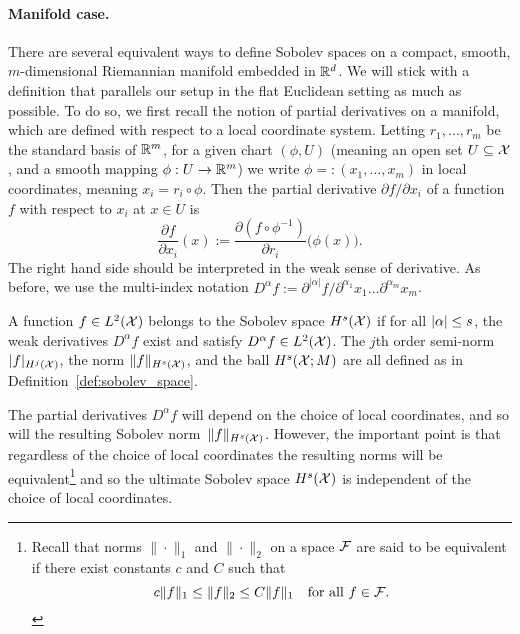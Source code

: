 \paragraph{Manifold case.}

There are several equivalent ways to define Sobolev spaces on a compact, smooth, $m$-dimensional Riemannian manifold embedded in $\mathbb{R}^d$. We will stick with a definition that parallels our setup in the flat Euclidean setting as much as possible. To do so, we first recall the notion of partial derivatives on a manifold, which are defined with respect to a local coordinate system. Letting $r_1,\ldots,r_m$ be the standard basis of $\mathbb{R}^m$, for a given chart $(\phi,U)$ (meaning an open set $U \subseteq \mathcal{X}$, and a smooth mapping $\phi: U \to \mathbb{R}^m$) we write $\phi =: (x_1,\ldots,x_m)$ in local coordinates, meaning $x_i = r_i \circ \phi$. Then the partial derivative $\partial f/\partial x_i$ of a function $f$ with respect to $x_i$ at $x \in U$ is
\begin{equation*}
\frac{\partial f}{\partial x_i}(x) := \frac{\partial(f \circ \phi^{-1})}{\partial r_i}\bigl(\phi(x)\bigr).
\end{equation*}
The right hand side should be interpreted in the weak sense of derivative. As before, we use the multi-index notation $D^{\alpha}f := \partial^{|\alpha|}f/\partial^{\alpha_1}x_1\ldots\partial^{\alpha_m}x_m$. 

\begin{definition}
	\label{def:sobolev_space_manifold}
	A function $f \in L^2(\mathcal{X})$ belongs to the Sobolev space $H^{s}(\mathcal{X})$ if for all $\left \lvert \alpha \right \rvert \leq s$, the weak derivatives $D^{\alpha}f$ exist and satisfy  $D^{\alpha}f \in L^2(\mathcal{X})$. The $j$th order semi-norm $|f|_{H^j(\mathcal{X})}$, the norm $\|f\|_{H^s(\mathcal{X})}$, and the ball $H^s(\mathcal{X};M)$ are all defined as in Definition~\ref{def:sobolev_space}.
\end{definition}
The partial derivatives $D^{\alpha}f$ will depend on the choice of local coordinates, and so will the resulting Sobolev norm~$\|f\|_{H^s(\mathcal{X})}$. However, the important point is that regardless of the choice of local coordinates the resulting norms will be equivalent\footnote{Recall that norms $\|\cdot\|_1$ and $\|\cdot\|_2$ on a space $\mathcal{F}$ are said to be equivalent if there exist constants $c$ and $C$ such that
\begin{equation*}
c \|f\|_1 \leq \|f\|_2 \leq C \|f\|_1 \quad \textrm{for all $f \in \mathcal{F}$.}
\end{equation*}} 
and so the ultimate Sobolev space $H^s(\mathcal{X})$ is independent of the choice of local coordinates. 

